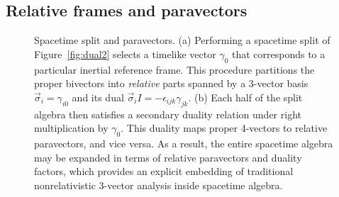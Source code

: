 \documentclass[1p,sort&compress]{elsarticle}
\numberwithin{equation}{section}
\newcommand{\rv}[1]{\vec{#1}}
\begin{document}

\subsection{Relative frames and paravectors}\label{sec:relative}


\begin{figure}[t]
  \begin{center}
    \quad
  \end{center}
  \caption[Spacetime split and paravectors]{Spacetime split and paravectors.  (a) Performing a spacetime split of Figure~\ref{fig:dual2} selects a timelike vector $\gamma_0$ that corresponds to a particular inertial reference frame.  This procedure partitions the proper bivectors into \emph{relative} parts spanned by a 3-vector basis $\rv{\sigma}_i = \gamma_{i0}$ and its dual $\rv{\sigma}_i I = -\epsilon_{ijk}\gamma_{jk}$.  (b) Each half of the split algebra then satisfies a secondary duality relation under right multiplication by $\gamma_0$.  This duality maps proper 4-vectors to relative paravectors, and vice versa.  As a result, the entire spacetime algebra may be expanded in terms of relative paravectors and duality factors, which provides an explicit embedding of traditional nonrelativistic 3-vector analysis inside spacetime algebra.}
  \label{fig:paravectors}
\end{figure}
\end{document}
